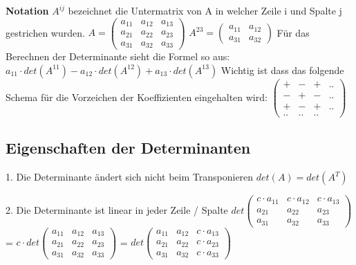 \documentclass[11pt,a4paper,onecolumn]{scrartcl}
\begin{document}
\begin{flushleft}
\textbf{Notation}\linebreak
$A^{ij} $ bezeichnet die Untermatrix von A in welcher Zeile i und Spalte j gestrichen wurden.\linebreak
$A = \begin{pmatrix}
a_{11} & a_{12} & a_{13} \\
a_{21} & a_{22} & a_{23} \\
a_{31} & a_{32} & a_{33} 
\end{pmatrix} 
$
$
A^{23} = \begin{pmatrix}
a_{11} & a_{12} \\
a_{31} & a_{32} 
\end{pmatrix}
$\linebreak
Für das Berechnen der Determinante sieht die Formel so aus: \linebreak
$a_{11} \cdot det(A^{11}) - a_{12} \cdot det(A^{12}) + a_{13} \cdot det(A^{13})$\linebreak
\linebreak
Wichtig ist dass das folgende Schema für die Vorzeichen der Koeffizienten eingehalten wird: \linebreak
$\begin{pmatrix}
+ & - & + & .. \\
- & + & - & ..\\
+ & - & + & .. \\
.. & .. &.. & 
\end{pmatrix}
$
\subsection{Eigenschaften der Determinanten}
1. Die Determinante ändert sich nicht beim Transponieren\linebreak
$det(A) = det(A^{T})$\linebreak

2. Die Determinante ist linear in jeder Zeile / Spalte \linebreak
$det \begin{pmatrix}
c \cdot a_{11} & c \cdot a_{12} & c \cdot a_{13} \\
a_{21} & a_{22} & a_{23} \\
a_{31} & a_{32} & a_{33} 
\end{pmatrix} 
$ = $
c \cdot det \begin{pmatrix}
a_{11} & a_{12} & a_{13} \\
a_{21} & a_{22} & a_{23} \\
a_{31} & a_{32} & a_{33} 
\end{pmatrix} 
$ = $
det \begin{pmatrix}
a_{11} & a_{12} & c \cdot a_{13} \\
a_{21} & a_{22} & c \cdot a_{23} \\
a_{31} & a_{32} & c \cdot a_{33} 
\end{pmatrix} 
$ \linebreak


\end{flushleft}
\end{document}
